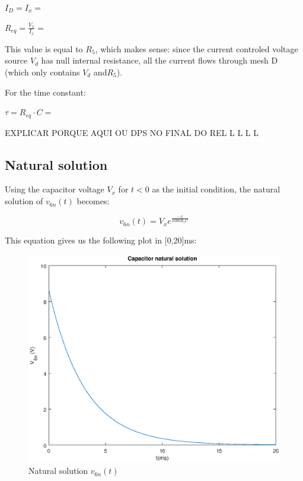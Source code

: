 $I_D = I_x = $
    
$R_{eq} = \frac{V_x}{I_x}= $

This value is equal to $R_5$, which makes sense: since the current controled voltage source $V_d$ has null internal resistance,  all the current flows through mesh D (which only contains $V_d$ and$R_5$).


For the time constant:

$\tau = R_{eq} \cdot C = $


EXPLICAR PORQUE AQUI OU DPS NO FINAL DO REL
L
L
L
L



\subsection{Natural solution}

Using the capacitor voltage $V_x$ for $t<0$ as the initial condition, the natural solution of $v_{6n}(t)$ becomes:

\begin{equation}
\label{eq:solucaonatural}
v_{6n}(t)=V_x e^{\frac{-x}{1000R_5C}}
\end{equation}

This equation gives us the following plot in [0,20]ms:

  \begin{figure}[H] \centering
    \includegraphics[width=1\linewidth]{natural.eps}
    \caption{Natural solution $v_{6n}(t)$}
    \label{fig:natural}
    \end{figure}



